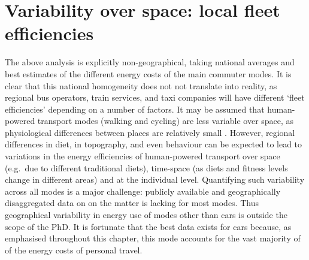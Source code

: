 \section{Variability over space: local fleet efficiencies}
\label{seffspace}
The above analysis is explicitly
non-geographical, taking national averages and best estimates of the different
energy costs of the main commuter modes. It is clear that this national
homogeneity does not not translate into reality, as regional bus operators,
train services, and taxi companies will have different `fleet efficiencies'
depending on a number of factors. It may be assumed that human-powered transport
modes (walking and cycling) are less variable over space, as physiological
differences between places are relatively small \citep{hayter1992variability,
Shetty2007}. However, regional differences in
diet, in topography, and even behaviour can be expected to lead to
variations in the energy efficiencies of human-powered transport over space
(e.g.~due to different traditional diets), time-space (as diets and fitness
levels change in different areas) and at the individual level. Quantifying
such variability across all modes is a major challenge: publicly
available and geographically disaggregated data on on the matter is lacking for
most modes. Thus geographical variability in energy use of modes other
than cars is outside the scope of the PhD. It is fortunate that the best data
exists for cars because, as emphasised throughout this chapter, this mode
accounts for
the vast majority of
of the energy costs of personal travel. 


